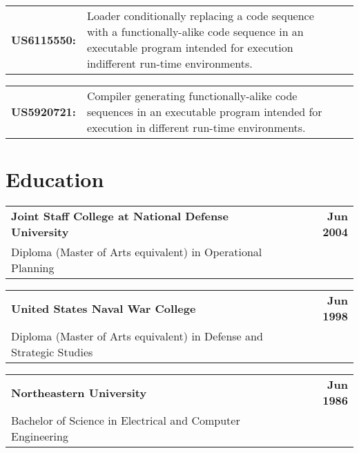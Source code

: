 \documentclass[letterpaper,10pt, sans]{article}
\makeatletter
\newcommand{\resumeEducationHeading}[3]{
  \item 
    \vspace{-1pt}
    \begin{tabular*}{1.0\textwidth}[t]{l@{\extracolsep{\fill}}r}
      \textbf{#1} & \textbf{#2} \\
      {#3}
    \end{tabular*}
    \vspace{-20pt}
  }
\newcommand{\resumeHeadingListStart}{\begin{description}[leftmargin=0cm]}
\newcommand{\resumeHeadingListEnd}{\end{description}}
\makeatother
\begin{document}
    \begin{tabular}{l p{475pt} l}
        \textbf{US6115550: } & Loader conditionally replacing a code sequence with a functionally-alike code sequence in an executable program intended for execution indifferent run-time environments.
    \end{tabular}

    \begin{tabular}{l p{475pt} l}
        \textbf{US5920721: } & Compiler generating functionally-alike code sequences in an executable program intended for execution in different run-time environments.
    \end{tabular}

\section{\textbf{Education}}
    \resumeHeadingListStart
        \resumeEducationHeading
        {Joint Staff College at National Defense University}
        {Jun 2004}
        {Diploma (Master of Arts equivalent) in Operational Planning}
        \resumeEducationHeading
        {United States Naval War College}
        {Jun 1998}
        {Diploma (Master of Arts equivalent) in Defense and Strategic Studies}
        \resumeEducationHeading
        {Northeastern University}
        {Jun 1986}
        {Bachelor of Science in Electrical and Computer Engineering}
    \resumeHeadingListEnd



\end{document}
